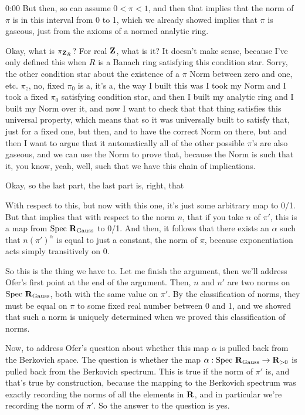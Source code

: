 \begin{unfinished}{0:00}
But then, so can assume $0 < \pi < 1$, and then that implies that the norm of $\pi$ is in this interval from 0 to 1, which we already showed implies that $\pi$ is gaseous, just from the axioms of a normed analytic ring.

Okay, what is $\pi_{\mathbf Z_R}$? For real $\mathbf Z$, what is it? It doesn't make sense, because I've only defined this when $R$ is a Banach ring satisfying this condition star. Sorry, the other condition star about the existence of a $\pi$ Norm between zero and one, etc. $\pi_z$, no, fixed $\pi_0$ is a, it's a, the way I built this was I took my Norm and I took a fixed $\pi_0$ satisfying condition star, and then I built my analytic ring and I built my Norm over it, and now I want to check that that thing satisfies this universal property, which means that so it was universally built to satisfy that, just for a fixed one, but then, and to have the correct Norm on there, but and then I want to argue that it automatically all of the other possible $\pi$'s are also gaseous, and we can use the Norm to prove that, because the Norm is such that it, you know, yeah, well, such that we have this chain of implications.

Okay, so the last part, the last part is, right, that

With respect to this, but now with this one, it's just some arbitrary map to 0/1. But that implies that with respect to the norm $n$, that if you take $n$ of $\pi'$, this is a map from $\mathrm{Spec}\ \R_{\text{Gauss}}$ to 0/1. And then, it follows that there exists an $\alpha$ such that $n(\pi')^{\alpha}$ is equal to just a constant, the norm of $\pi$, because exponentiation acts simply transitively on 0.

So this is the thing we have to. Let me finish the argument, then we'll address Ofer's first point at the end of the argument. Then, $n$ and $n'$ are two norms on $\mathrm{Spec}\ \R_{\text{Gauss}}$, both with the same value on $\pi'$. By the classification of norms, they must be equal on $\pi$ to some fixed real number between 0 and 1, and we showed that such a norm is uniquely determined when we proved this classification of norms.

Now, to address Ofer's question about whether this map $\alpha$ is pulled back from the Berkovich space. The question is whether the map $\alpha: \mathrm{Spec}\ \mathbf R_{\text{Gauss}} \to \mathbf R_{>0}$ is pulled back from the Berkovich spectrum. This is true if the norm of $\pi'$ is, and that's true by construction, because the mapping to the Berkovich spectrum was exactly recording the norms of all the elements in $\mathbf R$, and in particular we're recording the norm of $\pi'$. So the answer to the question is yes.


\end{unfinished}
